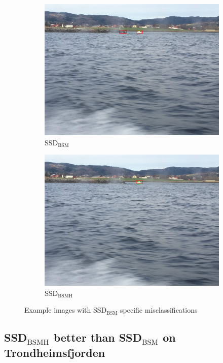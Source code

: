 \begin{figure}[h!]
\begin{subfigure}{.5\textwidth}
  \centering
  \includegraphics[width=0.75\linewidth]{results/case_buildings/ssdtrf/ssd2/grov2/IMG_2421.jpg}
  \caption{SSD$_{\text{BSM}}$}
\end{subfigure}%
\begin{subfigure}{.5\textwidth}
  \centering
  \includegraphics[width=.75\linewidth]{results/case_buildings/ssdtrf/ssd3/grov2/IMG_2421.jpg}
  \caption{SSD$_{\text{BSMH}}$}
\end{subfigure}
\caption{Example images with SSD$_{\text{BSM}}$ specific misclassifications}
\label{img:ssd_trf_grov2}
\end{figure}

\newpage

\subsection{SSD$_{\text{BSMH}}$ better than SSD$_{\text{BSM}}$ on Trondheimsfjorden}
\label{sec_ssd3_better_trf}

